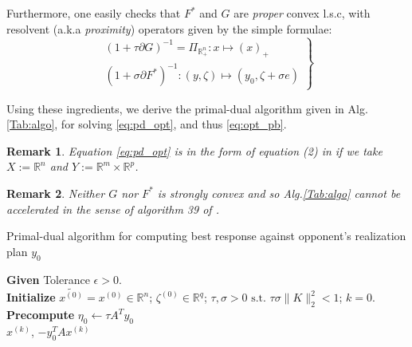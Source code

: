 \documentclass[a4paper,10pt,journal]{IEEEtran}
\newtheorem{remark}{Remark}
\begin{document}
Furthermore, one easily checks that $F^*$ and $G$ are \textit{proper} convex l.s.c, with resolvent
(a.k.a \textit{proximity}) operators given by the simple formulae:
\begin{equation}
  \left.
  \begin{aligned}
    (1 + \tau \partial G)^{-1} = \Pi_{\mathbb{R}_+^n}: x \mapsto (x)_+\\
    (1 + \sigma \partial F^*)^{-1}: (y, \zeta) \mapsto (y_0, \zeta + \sigma e)
  \end{aligned}
  \right\}
\end{equation}

Using these ingredients, we derive the primal-dual algorithm given in Alg.\ref{Tab:algo}, 
for solving \eqref{eq:pd_opt}, and thus \eqref{eq:opt_pb}.

\begin{remark}
Equation \eqref{eq:pd_opt} is in the form of equation (2) in \cite{chambolle2010} if we take $X := \mathbb{R}^n$ and
$Y := \mathbb{R}^m \times \mathbb{R}^p$.
\end{remark}

\begin{remark}
Neither $G$ nor $F^*$ is strongly convex and so Alg.\ref{Tab:algo} cannot be accelerated in the sense of algorithm 39 of \cite{chambolle2010}.
\end{remark}

\begin{algorithm}[htb]
  \caption{Primal-dual algorithm for computing best response against opponent's realization plan $y_0$}
  \textbf{Given} Tolerance $\epsilon > 0$.\\
  \textbf{Initialize} $\tilde{x^{(0)}} = x^{(0)} \in \mathbb{R}^n$; $\zeta^{(0)} \in \mathbb{R}^{q}$;
  $\tau, \sigma > 0 \text{ s.t. }\tau\sigma \|K\|_2^2 < 1$; $k = 0$.\\
  \textbf{Precompute} $\eta_0 \leftarrow \tau A^Ty_0$\\
   \Return $x^{(k)}$, $-y_0^TAx^{(k)}$
  \label{Tab:algo}
\end{algorithm}
\end{document}
